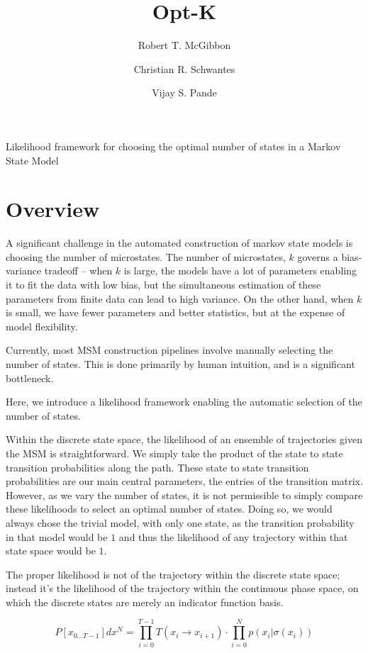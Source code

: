 \documentclass[twocolumn,floatfix,nofootinbib,aps]{revtex4-1}
\begin{document}
\title{Opt-K}
\author{Robert T. McGibbon}
\author{Christian R. Schwantes}
\author{Vijay S. Pande}
\maketitle

Likelihood framework for choosing the optimal number of states in a
Markov State Model

\section{Overview}

A significant challenge in the automated construction of markov state
models is choosing the number of microstates. The number of microstates,
$k$ governs a bias-variance tradeoff -- when $k$ is large, the models
have a lot of parameters enabling it to fit the data with low bias, but
the simultaneous estimation of these parameters from finite data can
lead to high variance. On the other hand, when $k$ is small, we have
fewer parameters and better statistics, but at the expense of model
flexibility.

Currently, most MSM construction pipelines involve manually selecting
the number of states. This is done primarily by human intuition, and is
a significant bottleneck.

Here, we introduce a likelihood framework enabling the automatic
selection of the number of states.

Within the discrete state space, the likelihood of an ensemble of
trajectories given the MSM is straightforward. We simply take the
product of the state to state transition probabilities along the path.
These state to state transition probabilities are our main central
parameters, the entries of the transition matrix. However, as we vary
the number of states, it is not permissible to simply compare these
likelihoods to select an optimal number of states. Doing so, we would
always chose the trivial model, with only one state, as the transition
probability in that model would be $1$ and thus the likelihood of any
trajectory within that state space would be $1$.

The proper likelihood is not of the trajectory within the discrete state
space; instead it's the likelihood of the trajectory within the
continuous phase space, on which the discrete states are merely an
indicator function basis. 

$$ 
P[x_{0...T-1}] dx^N = \prod_{i=0}^{T-1} T(x_i \rightarrow x_{i+1}) \cdot \prod_{i=0}^{N} p(x_{i} | \sigma(x_{i}))
$$
\end{document}

